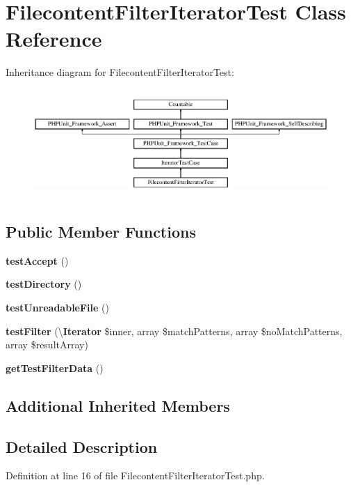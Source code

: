 \section{Filecontent\+Filter\+Iterator\+Test Class Reference}
\label{class_symfony_1_1_component_1_1_finder_1_1_tests_1_1_iterator_1_1_filecontent_filter_iterator_test}
Inheritance diagram for Filecontent\+Filter\+Iterator\+Test\+:\begin{figure}[H]
\begin{center}
\leavevmode
\includegraphics[height=4.129793cm]{class_symfony_1_1_component_1_1_finder_1_1_tests_1_1_iterator_1_1_filecontent_filter_iterator_test}
\end{center}
\end{figure}
\subsection*{Public Member Functions}
\begin{DoxyCompactItemize}
\item 
{\bf test\+Accept} ()
\item 
{\bf test\+Directory} ()
\item 
{\bf test\+Unreadable\+File} ()
\item 
{\bf test\+Filter} (\textbackslash{}{\bf Iterator} \$inner, array \$match\+Patterns, array \$no\+Match\+Patterns, array \$result\+Array)
\item 
{\bf get\+Test\+Filter\+Data} ()
\end{DoxyCompactItemize}
\subsection*{Additional Inherited Members}


\subsection{Detailed Description}


Definition at line 16 of file Filecontent\+Filter\+Iterator\+Test.\+php.



